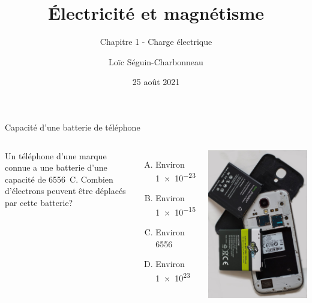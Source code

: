 \documentclass{beamer}
\title{Électricité et magnétisme}
\subtitle{Chapitre 1 - Charge électrique}
\date{25 août 2021}
\author{Loïc Séguin-Charbonneau}
\institute{Cégep Édouard-Montpetit}
\begin{document}
\maketitle

\begin{frame}{Capacité d'une batterie de téléphone}
\begin{columns}
  Un téléphone d'une marque connue a une batterie d'une capacité de \SI{6556}{C}.
  Combien d'électrons peuvent être déplacés par cette batterie?

  \begin{enumerate}[A.]
    \item Environ \num{1e-23}
    \item Environ \num{1e-15}
    \item Environ 6556
    \item<alert@2> Environ \num{1e23}
  \end{enumerate}

  \includegraphics[width=\textwidth]{figures/batterie-telephone.jpg}
\end{columns}
\end{frame}
\end{document}
